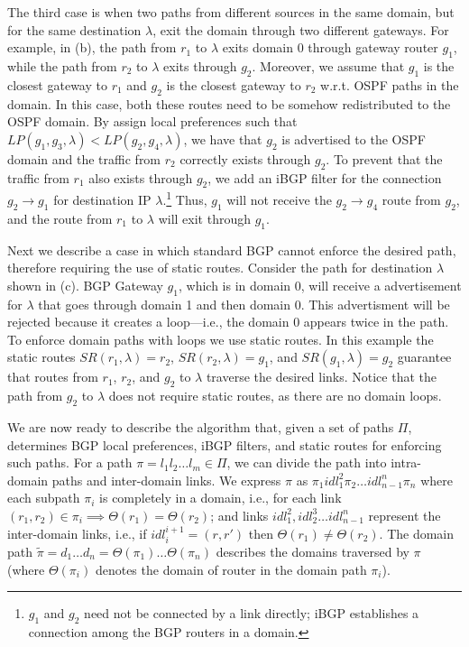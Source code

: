 The third case is when two paths from different sources in the same domain, but for the same destination $\lambda$, exit 
the domain through two different
gateways.
For example, in (b),
the path from $r_1$ to $\lambda$ exits domain 0 through 
gateway router $g_1$, while the path from $r_2$  to $\lambda$ exits 
through $g_2$. 
Moreover,  we assume that $g_1$ is the closest gateway to $r_1$ and 
$g_2$ is the closest gateway to $r_2$ w.r.t. OSPF paths in the domain.
In this case, both these routes need to be 
somehow redistributed to the OSPF domain. 
By assign local preferences such that
$LP(g_1,g_3,\lambda)<LP(g_2,g_4,\lambda)$,
we have that $g_2$ is advertised to the OSPF domain
and
the traffic from $r_2$ correctly exists through $g_2$. 
To prevent that the traffic from $r_1$ also exists through $g_2$,
we add an iBGP filter for the connection $g_2 \rightarrow g_1$ for
destination IP $\lambda$.\footnote{$g_1$ and $g_2$ need not be connected by a 
link directly; iBGP establishes a connection among the 
BGP routers in a domain.} Thus, $g_1$ will not receive the
$g_2 \rightarrow g_4$ route from $g_2$, 
and the route from  $r_1$ to $\lambda$ will exit through $g_1$.

 \label{sec:static}
Next we describe a case in which standard BGP cannot enforce
the desired path, therefore requiring the use of static routes.
Consider the path for destination $\lambda$ 
shown in (c). BGP Gateway $g_1$, which is in
domain $0$, 
will receive a advertisement for $\lambda$ that goes through domain
1 and then domain 0.
This advertisment will be rejected because it creates a loop---i.e., the domain 0
appears twice in the path. 
To enforce domain paths with loops we use static routes. In this example
the static routes
$SR(r_1,\lambda) = r_2$, $SR(r_2,\lambda) = g_1$, and $SR(g_1,\lambda) = g_2$ 
guarantee that routes from $r_1$, $r_2$, and $g_2$ to $\lambda$ traverse the desired links.
Notice that the path from $g_2$ to $\lambda$ does not 
require static routes, as there are no domain loops.

We are now ready to describe the algorithm that,
given a set of paths $\Pi$, determines
BGP local preferences, iBGP filters, and static routes for enforcing such paths.
For a path $\pi = l_1 l_2 \ldots l_m \in \Pi$, we
can divide the path into intra-domain paths and inter-domain
links. We express $\pi$ as 
$\pi_1 idl_1^2 \pi_2 \ldots idl_{n-1}^n \pi_n$ where
each subpath $\pi_i$ is completely in a
domain, i.e., for each 
link $(r_1,r_2) \in \pi_i \implies \Theta(r_1) = \Theta(r_2)$;
and links $idl_1^2, idl_2^3 \ldots idl_{n-1}^n$ 
represent the inter-domain links, i.e., 
if $idl_i^{i+1}=(r,r')$ then $\Theta(r_1) \neq \Theta(r_2)$. 
The domain path
$\tilde{\pi} = d_1 \ldots d_n=\Theta(\pi_1)\ldots \Theta(\pi_n)$ describes the 
domains traversed by $\pi$ (where
$\Theta(\pi_i)$ denotes the domain of router in the 
domain path $\pi_i$). 


